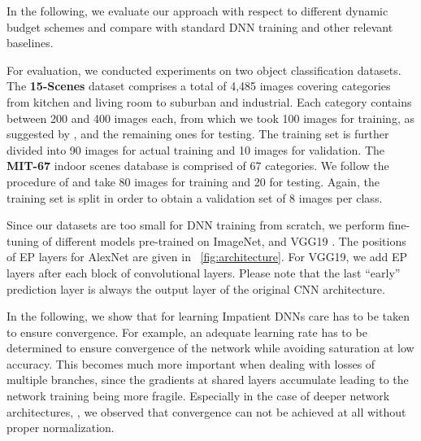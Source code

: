 \documentclass{bmvc2k}
\begin{document}
    In the following, we evaluate our approach with respect to different dynamic budget schemes and compare with
    standard DNN training and other relevant baselines.


    For evaluation, we conducted experiments on two object classification datasets.
    The \textbf{15-Scenes} \cite{lazebnik2006beyond} dataset comprises a total of 4,485 images covering categories from kitchen and living room to suburban and industrial.
    Each category contains between 200 and 400 images each, from which we took 100 images for training, as suggested by \cite{lazebnik2006beyond},
    and the remaining ones for testing.
    The training set is further divided into 90 images for actual training and 10 images for validation.
%
%
%
    The \textbf{MIT-67} \cite{quattoni2009recognizing} indoor scenes database is comprised of 67 categories.
    We follow the procedure of \cite{quattoni2009recognizing} and take 80 images for training and 20 for testing.
    Again, the training set is split in order to obtain a validation set of 8 images per class.



    Since our datasets are too small for DNN training from scratch, we perform fine-tuning of different models pre-trained on ImageNet, \eg\AlexNet \cite{krizhevsky2012imagenet} and VGG19 \cite{simonyan2014very}. The positions of EP layers for AlexNet are given in
    \figurename~\ref{fig:architecture}. For VGG19, we add EP layers after each block of convolutional layers. Please note that the last ``early'' prediction layer is always the output layer of the original CNN architecture.
%
%



    In the following, we show that for learning Impatient DNNs care has to be taken to ensure convergence.
    For example, an adequate learning rate has to be determined to ensure convergence of the network while avoiding saturation at low accuracy.
    This becomes much more important when dealing with losses of multiple branches, since the gradients at shared layers accumulate
    leading to the network training being more fragile.
    Especially in the case of deeper network architectures, \eg\VGG, we observed that convergence can not be achieved at all without proper normalization.
\end{document}
